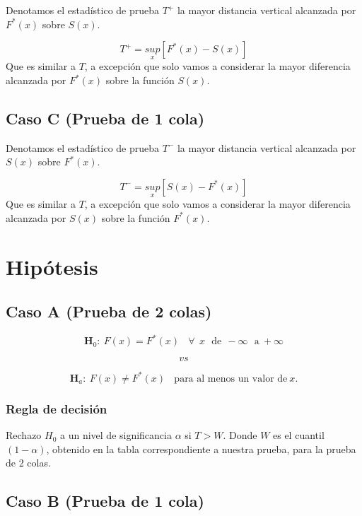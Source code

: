 \documentclass[
  a4paper,
  oneside,
  openany]{book}
\begin{document}
Denotamos el estadístico de prueba \(T^+\) la mayor distancia vertical alcanzada por \(F^*(x)\) sobre \(S(x)\).

\[T^+=\underset{x}{sup}[F^*(x)-S(x)] \]
Que es similar a \(T\), a excepción que solo vamos a considerar la mayor diferencia alcanzada por \(F^*(x)\) sobre la función \(S(x)\).

\hypertarget{caso-c-prueba-de-1-cola}{%
\subsection*{Caso C (Prueba de 1 cola)}\label{caso-c-prueba-de-1-cola}}


Denotamos el estadístico de prueba \(T^-\) la mayor distancia vertical alcanzada por \(S(x)\) sobre \(F^*(x)\).

\[T^-=\underset{x}{sup}[S(x)-F^*(x)] \]
Que es similar a \(T\), a excepción que solo vamos a considerar la mayor diferencia alcanzada por \(S(x)\) sobre la función \(F^*(x)\).

\hypertarget{hipuxf3tesis-14}{%
\section{Hipótesis}\label{hipuxf3tesis-14}}

\hypertarget{caso-a-prueba-de-2-colas-1}{%
\subsection*{Caso A (Prueba de 2 colas)}\label{caso-a-prueba-de-2-colas-1}}


\[\textbf{H}_0:\ F(x)=F^*(x) \ \ \ \ \forall \ \ x \ \ \  \mbox{de}\  \ -\infty \ \ \ \mbox{a} \  +\infty \]

\[vs\]

\[\textbf{H}_a: \ F(x) \neq F^*(x) \ \ \ \ \mbox{para al menos un  valor de} \   x.\]

\hypertarget{regla-de-decisiuxf3n-28}{%
\subsubsection*{Regla de decisión}\label{regla-de-decisiuxf3n-28}}


Rechazo \(H_0\) a un nivel de significancia \(\alpha\) si \(T>W\). Donde \(W\) es el cuantil \((1-\alpha)\), obtenido en la tabla correspondiente a nuestra prueba, para la prueba de 2 colas.

\hypertarget{caso-b-prueba-de-1-cola-1}{%
\subsection*{Caso B (Prueba de 1 cola)}\label{caso-b-prueba-de-1-cola-1}}
\end{document}

